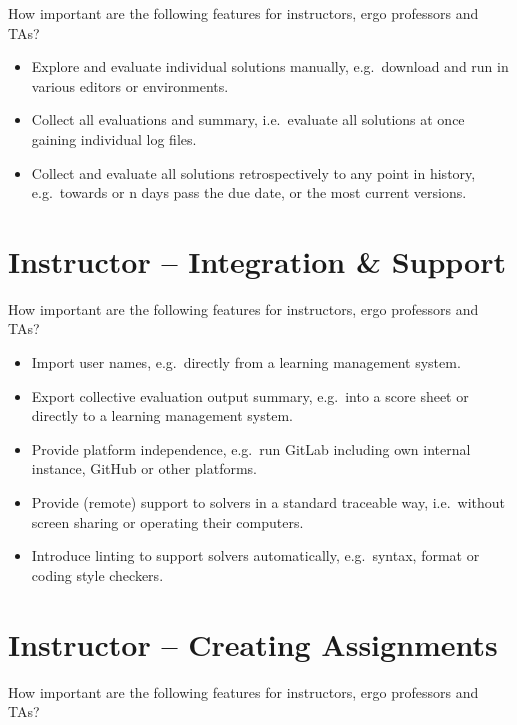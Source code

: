 How important are the following features for instructors, ergo professors and TAs?

\begin{itemize}
\item
  Explore and evaluate individual solutions manually, e.g.~download and run in various editors or environments.
\item
  Collect all evaluations and summary, i.e.~evaluate all solutions at once gaining individual log files.
\item
  Collect and evaluate all solutions retrospectively to any point in history, e.g.~towards or n days pass the due date, or the most current versions.
\end{itemize}

\section{Instructor -- Integration \& Support}\label{sec:instructor-integration-support}

How important are the following features for instructors, ergo professors and TAs?

\begin{itemize}
\item
  Import user names, e.g.~directly from a learning management system.
\item
  Export collective evaluation output summary, e.g.~into a score sheet or directly to a learning management system.
\item
  Provide platform independence, e.g.~run GitLab including own internal instance, GitHub or other platforms.
\item
  Provide (remote) support to solvers in a standard traceable way, i.e.~without screen sharing or operating their computers.
\item
  Introduce linting to support solvers automatically, e.g.~syntax, format or coding style checkers.
\end{itemize}

\section{Instructor -- Creating Assignments}\label{sec:instructor-creating-assignments}

How important are the following features for instructors, ergo professors and TAs?

